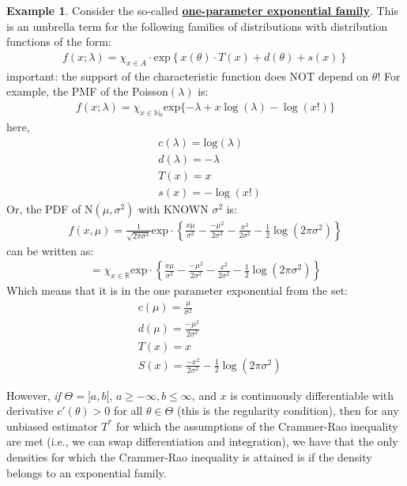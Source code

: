 \documentclass[11pt]{scrartcl}
\newcommand{\R}[0]{\mathbb{R}}
\theoremstyle{definition}
\newtheorem{ex}{Example}
\theoremstyle{remark}
\newcommand{\dfn}[1]{\textbf{\underline{#1}}}
\begin{document}
\begin{ex} 
	Consider the so-called \dfn{one-parameter exponential family}. This is an umbrella term for the following families of distributions with distribution functions of the form: 
	\begin{align*}
		f(x;	\lambda) = \chi_{x \in A} \cdot \text{exp} \left\{ x(\theta) \cdot T(x) + d(\theta) + s(x) \right\} 
	\end{align*}
	important: the support of the characteristic function does NOT depend on $\theta$! For example, the PMF of the Poisson$(\lambda)$ is: 
	\begin{align*}
		f(x; \lambda ) = \chi_{ x \in \mathbb{N}_0 } \text{exp} \{ - \lambda + x \log (\lambda) - \log (x!) \} 	
	\end{align*}
	here, 
	\begin{align*}
		& c(\lambda) = \text{log}(\lambda) \\
		& d(\lambda) = - \lambda \\
		& T(x) = x \\
		& s(x) = - \log (x!) 	
	\end{align*}
	Or, the PDF of N$(\mu, \sigma^2)$ with KNOWN $\sigma^2$ is:
	\begin{align*}
		f(x, \mu) = \frac{1}{\sqrt{2 \pi \sigma^2}}	\text{exp} \cdot \left\{ 	\frac{x \mu}{\sigma^2} - \frac{-\mu^2}{2 \sigma^2} - \frac{x^2}{2 \sigma^2} - \frac{1}{2} \log(2 \pi \sigma^2) 	\right\} 
	\end{align*}
	can be written as: 
	\begin{align*}	
		= \chi_{x \in \R} 	\text{exp} \cdot \left\{ 	\frac{x \mu}{\sigma^2} - \frac{-\mu^2}{2 \sigma^2} - \frac{x^2}{2 \sigma^2} - \frac{1}{2} \log(2 \pi \sigma^2) 	\right\} 
	\end{align*}
	Which means that it is in the one parameter exponential from the set:
	\begin{align*} 
			& c(\mu) = \frac{\mu}{\sigma^2} \\
			& d(\mu) = \frac{-\mu^2}{2 \sigma^2} \\
			& T(x) = x \\
			& S(x) = \frac{-x^2}{2 \sigma^2} - \frac{1}{2} \log (2 \pi \sigma^2) 
	\end{align*}
\end{ex}

However, \emph{if} $\Theta = ]a, b[$, $a \geq - \infty, b \leq \infty$, and $x$ is continuously differentiable with derivative $c'(\theta) > 0$ for all $\theta \in \Theta$ (this is the regularity condition), then for any unbiased estimator $T^*$ for which the assumptions of the Crammer-Rao inequality are met (i.e., we can swap differentiation and integration), we have that the only densities for which the Crammer-Rao inequality is attained is if the density belongs to an exponential family. 
\end{document}
